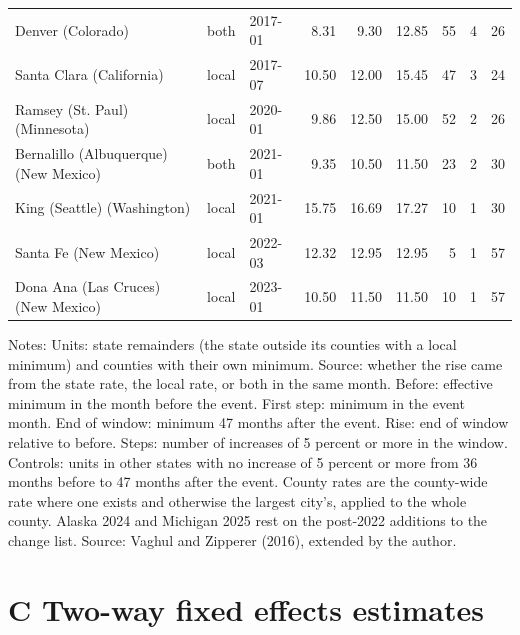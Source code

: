\documentclass[12pt]{article}
\begin{document}
\begin{table}
\begin{tabular}{lllrrrrrr}
Denver (Colorado) & both & 2017-01 & 8.31 & 9.30 & 12.85 & 55 & 4 & 26 \\
Santa Clara (California) & local & 2017-07 & 10.50 & 12.00 & 15.45 & 47 & 3 & 24 \\
Ramsey (St. Paul) (Minnesota) & local & 2020-01 & 9.86 & 12.50 & 15.00 & 52 & 2 & 26 \\
Bernalillo (Albuquerque) (New Mexico) & both & 2021-01 & 9.35 & 10.50 & 11.50 & 23 & 2 & 30 \\
King (Seattle) (Washington) & local & 2021-01 & 15.75 & 16.69 & 17.27 & 10 & 1 & 30 \\
Santa Fe (New Mexico) & local & 2022-03 & 12.32 & 12.95 & 12.95 & 5 & 1 & 57 \\
Dona Ana (Las Cruces) (New Mexico) & local & 2023-01 & 10.50 & 11.50 & 11.50 & 10 & 1 & 57 \\
\bottomrule
\end{tabular}



\noindent\small Notes: Units: state remainders (the state outside its counties with a local minimum) and counties with their own minimum. Source: whether the rise came from the state rate, the local rate, or both in the same month. Before: effective minimum in the month before the event. First step: minimum in the event month. End of window: minimum 47 months after the event. Rise: end of window relative to before. Steps: number of increases of 5 percent or more in the window. Controls: units in other states with no increase of 5 percent or more from 36 months before to 47 months after the event. County rates are the county-wide rate where one exists and otherwise the largest city's, applied to the whole county. Alaska 2024 and Michigan 2025 rest on the post-2022 additions to the change list. Source: Vaghul and Zipperer (2016), extended by the author.

\end{table}


\section{C Two-way fixed effects estimates}
\end{document}
